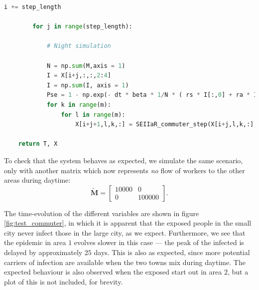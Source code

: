 \begin{lstlisting}[language=Python,label={lst:commuter},caption={SEIIaR commuter algorithm implemented in python}]
        i += step_length

        for j in range(step_length):

            # Night simulation 
            
            N = np.sum(M,axis = 1)
            I = X[i+j,:,:,2:4]
            I = np.sum(I, axis = 1)
            Pse = 1 - np.exp(- dt * beta * 1/N * ( rs * I[:,0] + ra * I[:,1] ))
            for k in range(m):
                for l in range(m):
                    X[i+j+1,l,k,:] = SEIIaR_commuter_step(X[i+j,l,k,:],Pse[k],Pei,Peia,Pir,Piar)

    return T, X
\end{lstlisting}

To check that the system behaves as expected, we simulate the same scenario, only with another matrix which now represents \textit{no} flow of workers to the other areas during daytime:
\begin{equation}\label{eq:test_matrix}
	\mathbf{\widetilde{M}} = \begin{bmatrix}
		10000 & 0 \\
		0 & 100000 
	\end{bmatrix}.
\end{equation}

The time-evolution of the different variables are shown in figure \ref{fig:test_commuter}, in which it is apparent that the exposed people in the small city never infect those in the large city, as we expect. Furthermore, we see that the epidemic in area $1$ evolves slower in this case --- the peak of the infected is delayed by approximately $25$ days. This is also as expected, since more potential carriers of infection are available when the two towns mix during daytime. The expected behaviour is also observed when the exposed start out in area $2$, but a plot of this is not included, for brevity. 


